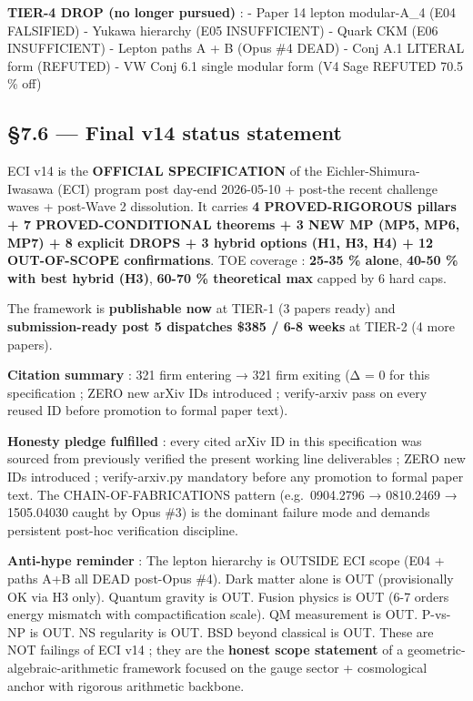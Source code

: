 \documentclass[
  11pt,
  a4paper,
]{article}
\begin{document}
\textbf{TIER-4 DROP (no longer pursued)} :
- Paper 14 lepton modular-A\_4 (E04 FALSIFIED)
- Yukawa hierarchy (E05 INSUFFICIENT)
- Quark CKM (E06 INSUFFICIENT)
- Lepton paths A + B (Opus \#4 DEAD)
- Conj A.1 LITERAL form (REFUTED)
- VW Conj 6.1 single modular form (V4 Sage REFUTED 70.5 \% off)

\hypertarget{final-v14-status-statement}{%
\subsection{§7.6 --- Final v14 status statement}\label{final-v14-status-statement}}

ECI v14 is the \textbf{OFFICIAL SPECIFICATION} of the Eichler-Shimura-Iwasawa (ECI) program post day-end 2026-05-10 + post-the recent challenge waves + post-Wave 2 dissolution. It carries \textbf{4 PROVED-RIGOROUS pillars + 7 PROVED-CONDITIONAL theorems + 3 NEW MP (MP5, MP6, MP7) + 8 explicit DROPS + 3 hybrid options (H1, H3, H4) + 12 OUT-OF-SCOPE confirmations}. TOE coverage : \textbf{25-35 \% alone}, \textbf{40-50 \% with best hybrid (H3)}, \textbf{60-70 \% theoretical max} capped by 6 hard caps.

The framework is \textbf{publishable now} at TIER-1 (3 papers ready) and \textbf{submission-ready post 5 dispatches \$385 / 6-8 weeks} at TIER-2 (4 more papers).

\textbf{Citation summary} : 321 firm entering → 321 firm exiting (Δ = 0 for this specification ; ZERO new arXiv IDs introduced ; verify-arxiv pass on every reused ID before promotion to formal paper text).

\textbf{Honesty pledge fulfilled} : every cited arXiv ID in this specification was sourced from previously verified the present working line deliverables ; ZERO new IDs introduced ; verify-arxiv.py mandatory before any promotion to formal paper text. The CHAIN-OF-FABRICATIONS pattern (e.g.~0904.2796 → 0810.2469 → 1505.04030 caught by Opus \#3) is the dominant failure mode and demands persistent post-hoc verification discipline.

\textbf{Anti-hype reminder} : The lepton hierarchy is OUTSIDE ECI scope (E04 + paths A+B all DEAD post-Opus \#4). Dark matter alone is OUT (provisionally OK via H3 only). Quantum gravity is OUT. Fusion physics is OUT (6-7 orders energy mismatch with compactification scale). QM measurement is OUT. P-vs-NP is OUT. NS regularity is OUT. BSD beyond classical is OUT. These are NOT failings of ECI v14 ; they are the \textbf{honest scope statement} of a geometric-algebraic-arithmetic framework focused on the gauge sector + cosmological anchor with rigorous arithmetic backbone.
\end{document}
